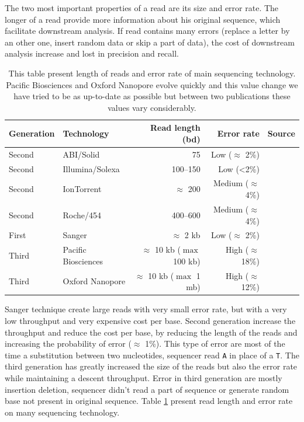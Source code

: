 \documentclass[./main.tex]{subfiles}
\begin{document}
The two most important properties of a read are its size and error rate. The longer of a read provide more information about his original sequence, which facilitate downstream analysis. If read contains many errors (replace a letter by an other one, insert random data or skip a part of data), the cost of downstream analysis increase and lost in precision and recall.

\begin{table}[ht]
    \centering
    \begin{tabular}{ll|rr|l}
Generation & Technology          & Read length (bd)                 & Error rate             & Source                          \\ \hline
Second     & ABI/Solid           & 75                               & Low ($\approx$ 2\%)    & \cite{seq_assembly_demystified} \\
Second     & Illumina/Solexa     & 100–150                          & Low (<2\%)             & \cite{seq_assembly_demystified} \\
Second     & IonTorrent          & $\approx$ 200                    & Medium ($\approx$ 4\%) & \cite{seq_assembly_demystified} \\
Second     & Roche/454           & 400–600                          & Medium ($\approx$ 4\%) & \cite{seq_assembly_demystified} \\
First      & Sanger              & $\approx$ 2 kb                   & Low ($\approx$ 2\%)    & \cite{seq_assembly_demystified} \\
Third      & Pacific Biosciences & $\approx$ 10 kb ($\max$ 100 kb)  & High ($\approx$ 18\%)  & \cite{seq_assembly_demystified} \cite{longread_dark_matter} \\
Third      & Oxford Nanopore     & $\approx$ 10 kb ($\max$ 1 mb)    & High ($\approx$ 12\%)  & \cite{longread_dark_matter} \cite{nanopore_read_accuracy} \\
    \end{tabular}
    \caption{This table present length of reads and error rate of main sequencing technology. Pacific Biosciences and Oxford Nanopore evolve quickly and this value change we have tried to be as up-to-date as possible but between two publications these values vary considerably.}
    \label{intro:tab:technology_property}
\end{table}

Sanger technique create large reads with very small error rate, but with a very low throughput and very expensive cost per base.
Second generation increase the throughput and reduce the cost per base, by reducing the length of the reads and increasing the probability of error ($\approx$ 1\%). This type of error are most of the time a substitution between two nucleotides, sequencer read \texttt{A} in place of a \texttt{T}.
The third generation has greatly increased the size of the reads but also the error rate while maintaining a descent throughput. Error in third generation are mostly insertion deletion, sequencer didn't read a part of sequence or generate random base not present in original sequence. Table \ref{intro:tab:technology_property} present read length and error rate on many sequencing technology.
\end{document}
